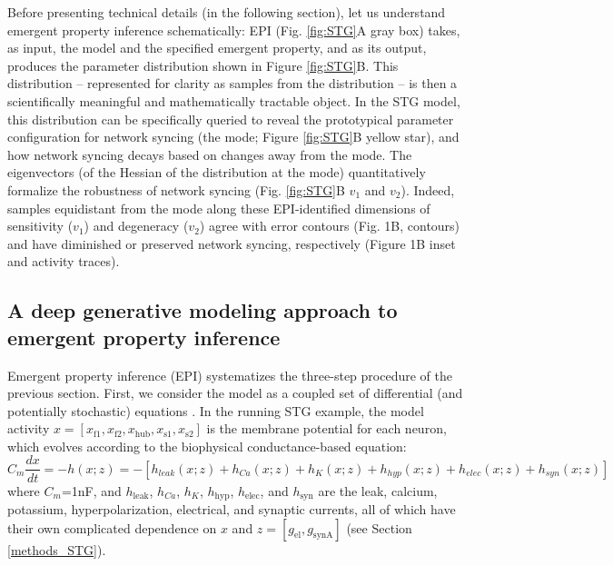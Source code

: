 \documentclass[11pt]{article}
\begin{document}
Before presenting technical details (in the following section), let us understand emergent property inference schematically:  EPI (Fig. \ref{fig:STG}A gray box) takes, as input, the model and the specified emergent property, and as its output, produces the parameter distribution shown in Figure \ref{fig:STG}B.  
This distribution -- represented for clarity as samples from the distribution -- is then a scientifically meaningful and mathematically tractable object.  
In the STG model, this distribution can be specifically queried to reveal the prototypical parameter configuration for network syncing (the mode; Figure \ref{fig:STG}B yellow star), and how network syncing decays based on changes away from the mode.
The eigenvectors (of the Hessian of the distribution at the mode) quantitatively formalize the robustness of network syncing (Fig. \ref{fig:STG}B $v_1$ and $v_2$).
Indeed, samples equidistant from the mode along these EPI-identified dimensions of sensitivity ($v_1$) and degeneracy ($v_2$) agree with error contours (Fig. 1B, contours) and have diminished or preserved network syncing, respectively (Figure 1B inset and activity traces). 

\subsection{A deep generative modeling approach to emergent property inference} \label{results_dgm}

Emergent property inference (EPI) systematizes the three-step procedure of the previous section.
First, we consider the model as a coupled set of differential (and potentially stochastic) equations \cite{gutierrez2013multiple}.  In the running STG example, the model activity $x = \left[ x_{\text{f1}}, x_{\text{f2}}, x_{\text{hub}}, x_{\text{s1}}, x_{\text{s2}} \right]$ is the membrane potential for each neuron, which evolves according to the biophysical conductance-based equation:
\begin{equation} C_m \frac{dx}{dt} = -h(x; z) = - \left[ h_{leak}(x; z) + h_{Ca}(x; z) + h_K(x; z) + h_{hyp}(x; z) + h_{elec}(x; z) + h_{syn}(x; z)\right] 
\end{equation} 
where $C_m$=1nF, and $h_{\text{leak}}$, $h_{Ca}$, $h_K$, $h_{\text{hyp}}$, $h_{\text{elec}}$, and $h_{\text{syn}}$ are the leak, calcium, potassium, hyperpolarization, electrical, and synaptic currents, all of which have their own complicated dependence on $x$ and $z = [g_{\text{el}}, g_{\text{synA}}]$ (see Section \ref{methods_STG}).
\end{document}
